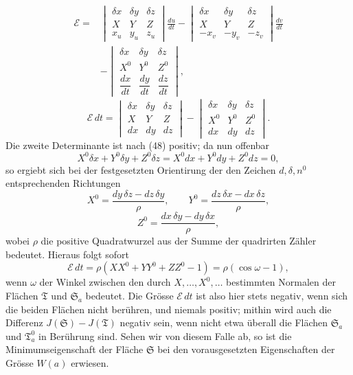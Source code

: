 \documentclass[11pt,a4paper,leqno]{article}
\begin{document}
\[
\begin{aligned}
\mathcal{E}={}&
\begin{vmatrix}
\delta x&\delta y&\delta z\\ X&Y&Z\\ x_u&y_u&z_u
\end{vmatrix}\frac{du}{dt}
-\begin{vmatrix}
\delta x&\delta y&\delta z\\ X&Y&Z\\ -x_v&-y_v&-z_v
\end{vmatrix}\frac{dv}{dt}\\
&-\begin{vmatrix}
\delta x&\delta y&\delta z\\ X^0&Y^0&Z^0\\
\dfrac{dx}{dt}&\dfrac{dy}{dt}&\dfrac{dz}{dt}
\end{vmatrix},
\end{aligned}
\]
\[
\mathcal{E}\,dt=
\begin{vmatrix}
\delta x&\delta y&\delta z\\ X&Y&Z\\ dx&dy&dz
\end{vmatrix}
-\begin{vmatrix}
\delta x&\delta y&\delta z\\ X^0&Y^0&Z^0\\ dx&dy&dz
\end{vmatrix}.
\]
Die zweite Determinante ist nach (48) positiv; da nun offenbar
\[
X^0\delta x+Y^0\delta y+Z^0\delta z
=X^0dx+Y^0dy+Z^0dz=0,
\]
so ergiebt sich bei der festgesetzten Orientirung der den Zeichen
$d,\delta,n^0$ entsprechenden Richtungen
\[
X^0=\frac{dy\,\delta z-dz\,\delta y}{\rho},\qquad
Y^0=\frac{dz\,\delta x-dx\,\delta z}{\rho},
\]
\[
Z^0=\frac{dx\,\delta y-dy\,\delta x}{\rho},
\]
wobei $\rho$ die positive Quadratwurzel aus der Summe der quadrirten Zähler
bedeutet. Hieraus folgt sofort
\[
\mathcal{E}\,dt=\rho(XX^0+YY^0+ZZ^0-1)=\rho(\cos\omega-1),
\]
wenn $\omega$ der Winkel zwischen den durch $X,\ldots,X^0,\ldots$
bestimmten Normalen der Flächen $\mathfrak{T}$ und $\mathfrak{S}_a$
bedeutet. Die Grösse $\mathcal{E}\,dt$ ist also hier stets negativ, wenn sich
die beiden Flächen nicht berühren, und niemals positiv; mithin wird auch die
Differenz $J(\mathfrak{S})-J(\mathfrak{T})$ negativ sein, wenn nicht etwa
überall die Flächen $\mathfrak{S}_a$ und $\mathfrak{T}_a^0$ in Berührung sind.
Sehen wir von diesem Falle ab, so ist die Minimumseigenschaft der Fläche
$\mathfrak{S}$ bei den vorausgesetzten Eigenschaften der Grösse $W(a)$
erwiesen.
\end{document}
